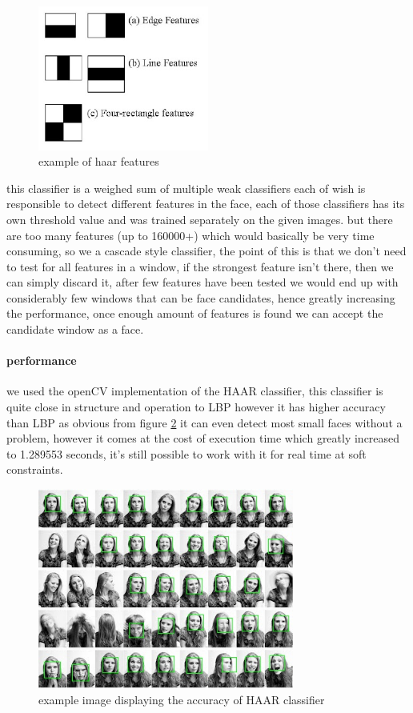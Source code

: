 \begin{figure}
	\centering
	\includegraphics[width=0.5\textwidth]{images/haar_features.jpg}
	\caption{example of haar features}
	\label{fig:haar_features}
\end{figure}

this classifier is a weighed sum of multiple weak classifiers each of wish is responsible to detect different features in the face, each of those classifiers has its own threshold value and was trained separately on the given images.
but there are too many features (up to 160000+) which would basically be very time consuming, so we a cascade style classifier, the point of this is that we don't need to test for all features in a window, if the strongest feature isn't there, then we can simply discard it, after few features have been tested we would end up with considerably few windows that can be face candidates, hence greatly increasing the performance, once enough amount of features is found we can accept the candidate window as a face.

\paragraph{performance}
we used the openCV implementation of the HAAR classifier, this classifier is quite close in structure and operation to LBP however it has higher accuracy than LBP as obvious from figure \ref{fig:haar_example} it can even detect most small faces without a problem, however it comes at the cost of execution time which greatly increased to 1.289553 seconds, it's still possible to work with it for real time at soft constraints.
\begin{figure}
	\centering
	\includegraphics[width=0.75\textwidth]{images/haar_example.jpg}
	\caption{example image displaying the accuracy of HAAR classifier}
	\label{fig:haar_example}
\end{figure}

